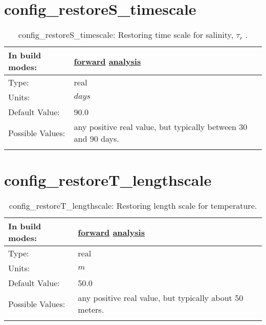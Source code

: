 \section[config\_restoreS\_timescale]{config\_restoreS\_timescale}
\label{sec:nm_sec_config_restoreS_timescale}
\begin{center}
\begin{longtable}{| p{2.0in} || p{4.0in} |}
    \hline
    In build modes: & \hyperref[subsec:forward_nm_tab_forcing]{forward} \hyperref[subsec:analysis_nm_tab_forcing]{analysis} \\
    \hline
    Type: & real \\
    \hline
    Units: & $days$ \\
    \hline
    Default Value: & 90.0 \\
    \hline
    Possible Values: & any positive real value, but typically between 30 and 90 days. \\
    \hline
    \caption{config\_restoreS\_timescale:  Restoring time scale for salinity,  $\tau_r$ .}
\end{longtable}
\end{center}
\section[config\_restoreT\_lengthscale]{config\_restoreT\_lengthscale}
\label{sec:nm_sec_config_restoreT_lengthscale}
\begin{center}
\begin{longtable}{| p{2.0in} || p{4.0in} |}
    \hline
    In build modes: & \hyperref[subsec:forward_nm_tab_forcing]{forward} \hyperref[subsec:analysis_nm_tab_forcing]{analysis} \\
    \hline
    Type: & real \\
    \hline
    Units: & $m$ \\
    \hline
    Default Value: & 50.0 \\
    \hline
    Possible Values: & any positive real value, but typically about 50 meters. \\
    \hline
    \caption{config\_restoreT\_lengthscale: Restoring length scale for temperature.}
\end{longtable}
\end{center}
